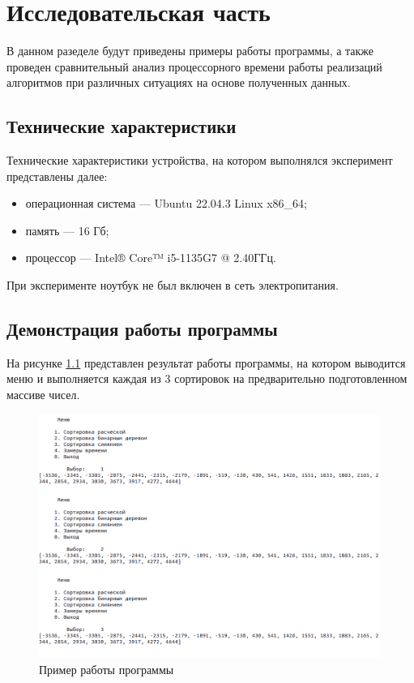 \chapter{Исследовательская часть}

В данном разеделе будут приведены примеры работы программы, а также проведен сравнительный анализ процессорного времени работы реализаций алгоритмов при различных ситуациях на основе полученных данных.

\section{Технические характеристики}

Технические характеристики устройства, на котором выполнялся эксперимент представлены далее:

\begin{itemize}
	\item операционная система --- Ubuntu 22.04.3 \cite{ubuntu} Linux x86\_64;
	\item память --- 16 Гб;
	\item процессор --- Intel® Core™ i5-1135G7 @ 2.40ГГц.
\end{itemize}

При эксперименте ноутбук не был включен в сеть электропитания.

\section{Демонстрация работы программы}

На рисунке \ref{fig:example} представлен результат работы программы, на котором выводится меню и выполняется каждая из 3 сортировок на предварительно подготовленном массиве чисел.

\begin{figure}[h!]
	\centering
	\includegraphics[width=\linewidth]{img/example}
	\caption{Пример работы программы}
	\label{fig:example}
\end{figure}
\clearpage

